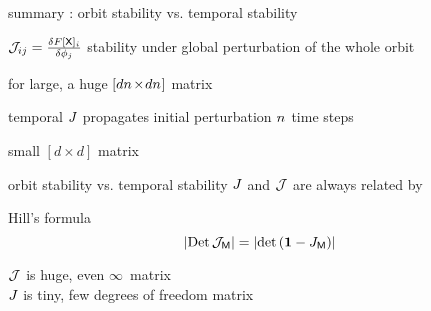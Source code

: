 \begin{frame}{summary : orbit stability vs. temporal stability}
\begin{block}{\jacobianOrb}
\(
{\cal J}_{ij} =\frac{\delta F[\mathsf{X}]_i}{\delta \phi_j}
\)
stability under {\color{blue}global} perturbation of the whole orbit

\hfill for \cl{} large, a huge $[d{n_{}}\!\times\!d{n_{}}]$ matrix
\end{block}
\begin{block}{temporal {\jacobianM}}
\(
\jMps%
\)
propagates {\color{blue}initial} perturbation ${n_{}}$ time steps

\hfill small $[d\!\times\!d]$ matrix
\end{block}
\end{frame}

\begin{frame}{orbit stability vs. temporal stability}
$J$ and ${\cal J}$ are {\color{red}always} related by
\begin{block}{Hill's  formula}
\[
|\mbox{\rm Det}\,{\cal J}_{\mathsf{M}}| = |\mbox{\rm det}\,({\bf 1} - J_{\mathsf{M}})|
\]
\end{block}
${\cal J}$ is {\color{red}huge}, even $\infty$\dmn\ matrix\\
$J$ is {\color{red}tiny}, few degrees of freedom matrix
\end{frame}


